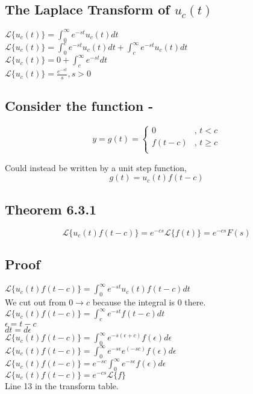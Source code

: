 \documentclass[12pt, letterpaper, twoside]{article}
\newcommand{\laplace}{\mathcal{L}}
\begin{document}
\subsection*{The Laplace Transform of $u_c(t)$}
$\laplace\{u_c(t)\}=\int_0^\infty e^{-st}u_c(t) dt$\\
$\laplace\{u_c(t)\}=\int_0^c e^{-st}u_c(t) dt + \int_c^\infty e^{-st}u_c(t) dt$\\
$\laplace\{u_c(t)\}=0 + \int_c^\infty e^{-st} dt$\\
$\laplace\{u_c(t)\}=\frac{e^{-st}}{s}, s>0$\\

\subsection*{Consider the function - }
\[
  y= g(t) =
  \begin{cases}
  	0 & \text{, $t < c$} \\
  	f(t-c) & \text{, $t \geq c$} \\
  \end{cases}
\]

Could instead be written by a unit step function,
$$g(t)=u_c(t)f(t-c)$$

\subsection*{Theorem 6.3.1}
$$\laplace\{u_c(t)f(t-c)\} = e^{-cs} \laplace\{f(t)\} = e^{-cs}F(s)$$

\subsection*{Proof}
$\laplace\{u_c(t)f(t-c)\} = \int_0^\infty e^{-st}u_c(t)f(t-c)dt$\\
We cut out from $0 \to c$ because the integral is 0 there.\\
$\laplace\{u_c(t)f(t-c)\} = \int_c^\infty e^{-st}f(t-c) dt$\\
$\epsilon = t-c$\\
$dt = d\epsilon$\\
$\laplace\{u_c(t)f(t-c)\} = \int_0^\infty e^{-s(\epsilon + c)}f(\epsilon) d\epsilon$\\
$\laplace\{u_c(t)f(t-c)\} = \int_0^\infty e^{-s\epsilon}e^{(-sc)}f(\epsilon) d\epsilon$\\
$\laplace\{u_c(t)f(t-c)\} = e^{-sc} \int_0^\infty e^{-s\epsilon} f(\epsilon) d\epsilon$\\
$\laplace\{u_c(t)f(t-c)\} = e^{-cs} \laplace\{f\}$\\
Line 13 in the transform table.
\end{document}
